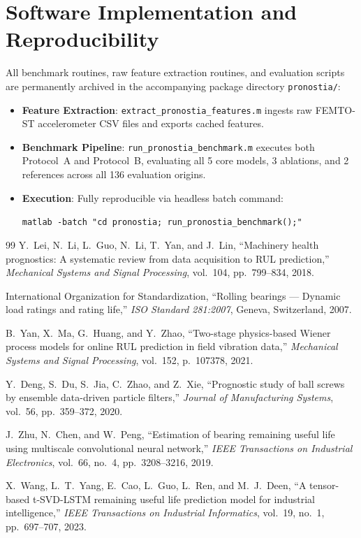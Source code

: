 \documentclass[11pt,a4paper]{article}
\begin{document}
\section{Software Implementation and Reproducibility}
\label{sec:annex_reproducibility}

All benchmark routines, raw feature extraction routines, and evaluation scripts are permanently archived in the accompanying package directory \texttt{pronostia/}:
\begin{itemize}[leftmargin=2.2em]
    \item \textbf{Feature Extraction}: \texttt{extract\_pronostia\_features.m} ingests raw FEMTO-ST accelerometer CSV files and exports cached features.
    \item \textbf{Benchmark Pipeline}: \texttt{run\_pronostia\_benchmark.m} executes both Protocol~A and Protocol~B, evaluating all 5 core models, 3 ablations, and 2 references across all 136 evaluation origins.
    \item \textbf{Execution}: Fully reproducible via headless batch command:
    \begin{center}
        \texttt{matlab -batch "cd pronostia; run\_pronostia\_benchmark();"}
    \end{center}
\end{itemize}

\begin{thebibliography}{99}
Y.~Lei, N.~Li, L.~Guo, N.~Li, T.~Yan, and J.~Lin, ``Machinery health prognostics: A systematic review from data acquisition to {RUL} prediction,'' \emph{Mechanical Systems and Signal Processing}, vol.~104, pp.~799--834, 2018.

International Organization for Standardization, ``Rolling bearings --- Dynamic load ratings and rating life,'' \emph{ISO Standard 281:2007}, Geneva, Switzerland, 2007.

B.~Yan, X.~Ma, G.~Huang, and Y.~Zhao, ``Two-stage physics-based {Wiener} process models for online {RUL} prediction in field vibration data,'' \emph{Mechanical Systems and Signal Processing}, vol.~152, p.~107378, 2021.

Y.~Deng, S.~Du, S.~Jia, C.~Zhao, and Z.~Xie, ``Prognostic study of ball screws by ensemble data-driven particle filters,'' \emph{Journal of Manufacturing Systems}, vol.~56, pp.~359--372, 2020.

J.~Zhu, N.~Chen, and W.~Peng, ``Estimation of bearing remaining useful life using multiscale convolutional neural network,'' \emph{IEEE Transactions on Industrial Electronics}, vol.~66, no.~4, pp.~3208--3216, 2019.

X.~Wang, L.~T.~Yang, E.~Cao, L.~Guo, L.~Ren, and M.~J.~Deen, ``A tensor-based {t-SVD-LSTM} remaining useful life prediction model for industrial intelligence,'' \emph{IEEE Transactions on Industrial Informatics}, vol.~19, no.~1, pp.~697--707, 2023.
\end{thebibliography}
\end{document}
